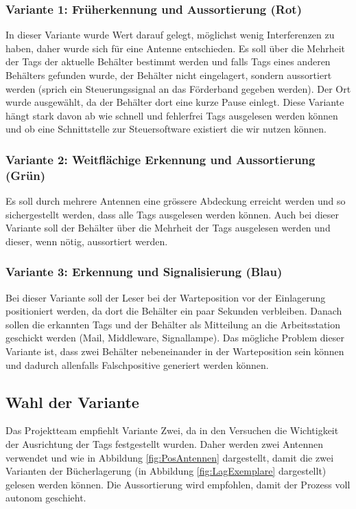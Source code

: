\subsubsection{Variante 1: Früherkennung und Aussortierung (Rot)}
In dieser Variante wurde Wert darauf gelegt, möglichst wenig Interferenzen zu haben, daher wurde sich für eine Antenne entschieden. Es soll über die Mehrheit der Tags der aktuelle Behälter bestimmt werden und falls Tags eines anderen Behälters gefunden wurde, der Behälter nicht eingelagert, sondern aussortiert werden (sprich ein Steuerungssignal an das Förderband gegeben werden). Der Ort wurde ausgewählt, da der Behälter dort eine kurze Pause einlegt. Diese Variante hängt stark davon ab wie schnell und fehlerfrei Tags ausgelesen werden können und ob eine Schnittstelle zur Steuersoftware existiert die wir nutzen können.

\subsubsection{Variante 2: Weitflächige Erkennung und Aussortierung (Grün)}
Es soll durch mehrere Antennen eine grössere Abdeckung erreicht werden und so sichergestellt werden, dass alle Tags ausgelesen werden können. Auch bei dieser Variante soll der Behälter über die Mehrheit der Tags ausgelesen werden und dieser, wenn nötig, aussortiert werden.

\subsubsection{Variante 3: Erkennung und Signalisierung (Blau)}
Bei dieser Variante soll der Leser bei der Warteposition vor der Einlagerung positioniert werden, da dort die Behälter ein paar Sekunden verbleiben. Danach sollen die erkannten Tags und der Behälter als Mitteilung an die Arbeitsstation geschickt werden (Mail, Middleware, Signallampe). Das mögliche Problem dieser Variante ist, dass zwei Behälter nebeneinander in der Warteposition sein können und dadurch allenfalls Falschpositive generiert werden können.

\subsection{Wahl der Variante}

Das Projektteam empfiehlt Variante Zwei, da in den Versuchen die Wichtigkeit der Ausrichtung der Tags festgestellt wurden. Daher werden zwei Antennen verwendet und wie in Abbildung \ref{fig:PosAntennen} dargestellt, damit die zwei Varianten der Bücherlagerung (in Abbildung \ref{fig:LagExemplare} dargestellt) gelesen werden können. Die Aussortierung wird empfohlen, damit der Prozess voll autonom geschieht.


